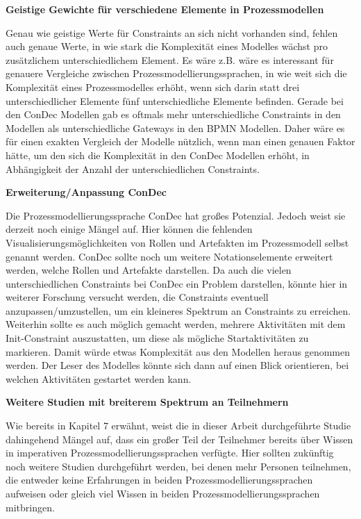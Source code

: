 \textbf{Geistige Gewichte für verschiedene Elemente in Prozessmodellen}

Genau wie geistige Werte für Constraints an sich nicht vorhanden sind, fehlen auch genaue Werte, in wie stark die Komplexität eines Modelles wächst pro zusätzlichem unterschiedlichem Element. Es wäre z.B. wäre es interessant für genauere Vergleiche zwischen Prozessmodellierungssprachen, in wie weit sich die Komplexität eines Prozessmodelles erhöht, wenn sich darin statt drei unterschiedlicher Elemente fünf unterschiedliche Elemente befinden. Gerade bei den ConDec Modellen gab es oftmals mehr unterschiedliche Constraints in den Modellen als unterschiedliche Gateways in den BPMN Modellen. Daher wäre es für einen exakten Vergleich der Modelle nützlich, wenn man einen genauen Faktor hätte, um den sich die Komplexität in den ConDec Modellen erhöht, in Abhängigkeit der Anzahl der unterschiedlichen Constraints.  


\textbf{Erweiterung/Anpassung ConDec}

Die Prozessmodellierungssprache ConDec hat großes Potenzial. Jedoch weist sie derzeit noch einige Mängel auf. Hier können die fehlenden Visualisierungsmöglichkeiten von Rollen und Artefakten im Prozessmodell selbst genannt werden. ConDec sollte noch um weitere Notationselemente erweitert werden, welche Rollen und Artefakte darstellen.\newline
Da auch die vielen unterschiedlichen Constraints bei ConDec ein Problem darstellen, könnte hier in weiterer Forschung versucht werden, die Constraints eventuell anzupassen/umzustellen, um ein kleineres Spektrum an Constraints zu erreichen.\newline
Weiterhin sollte es auch möglich gemacht werden, mehrere Aktivitäten mit dem Init-Constraint auszustatten, um diese als mögliche Startaktivitäten zu markieren. Damit würde etwas Komplexität aus den Modellen heraus genommen werden. Der Leser des Modelles könnte sich dann auf einen Blick orientieren, bei welchen Aktivitäten gestartet werden kann.\newline

\textbf{Weitere Studien mit breiterem Spektrum an Teilnehmern}

Wie bereits in Kapitel 7 erwähnt, weist die in dieser Arbeit durchgeführte Studie dahingehend Mängel auf, dass ein großer Teil der Teilnehmer bereits über Wissen in imperativen Prozessmodellierungssprachen verfügte. Hier sollten zukünftig noch weitere Studien durchgeführt werden, bei denen mehr Personen teilnehmen, die entweder keine Erfahrungen in beiden Prozessmodellierungssprachen aufweisen oder gleich viel Wissen in beiden Prozessmodellierungssprachen mitbringen.\newline





